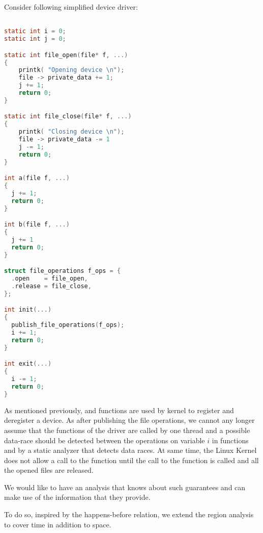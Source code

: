 \documentclass[..thesis.tex]{subfiles}
\begin{document}
Consider following simplified device driver:
\begin{lstlisting}[language=c,style=def,columns=fullflexible]

static int i = 0;
static int j = 0;

static int file_open(file* f, ...)
{
    printk( "Opening device \n");
    file -> private_data += 1;
    j += 1;
    return 0;
}

static int file_close(file* f, ...)
{
    printk( "Closing device \n");
    file -> private_data -= 1
    j -= 1;
    return 0;
}

int a(file f, ...)
{
  j += 1;
  return 0;
}

int b(file f, ...)
{
  j += 1
  return 0;
}

struct file_operations f_ops = {
  .open    = file_open,
  .release = file_close,
};

int init(...)
{
  publish_file_operations(f_ops);
  i += 1;
  return 0;
}

int exit(...)
{
  i -= 1;
  return 0;
}

\end{lstlisting}


As mentioned previously,  and  functions are used by kernel to register and deregister a device.
As after publishing the file operations, we cannot any longer assume that the functions of the driver are called by one thread and
a possible data-race should be detected between the operations on variable $i$ in functions  and  by a static analyzer that detects data races.
At same time, the Linux Kernel does not allow a call to the  function until the call to the  function is called and all the opened files are released.

We would like to have an analysis that knows about such guarantees and can make use of the information that they provide.


To do so, inspired by the happens-before relation,  we extend the region analysis to cover time in addition to space.

\end{document}
